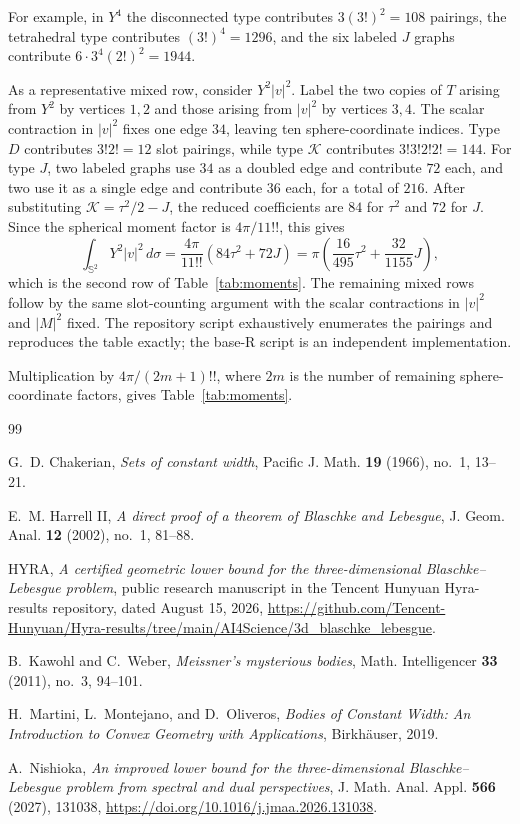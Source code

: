\documentclass[11pt,reqno]{amsart}
\theoremstyle{remark}
\newcommand{\Sph}{\mathbb S^2}
\newcommand{\dd}{\,d\sigma}
\newcommand{\abs}[1]{\left\lvert #1\right\rvert}
\begin{document}
For example, in $Y^4$ the disconnected type contributes
$3(3!)^2=108$ pairings, the tetrahedral type contributes $(3!)^4=1296$, and
the six labeled $J$ graphs contribute
$6\cdot 3^4(2!)^2=1944$.

As a representative mixed row, consider $Y^2\abs v^2$. Label the two copies of
$T$ arising from $Y^2$ by vertices $1,2$ and those arising from $\abs v^2$ by
vertices $3,4$. The scalar contraction in $\abs v^2$ fixes one edge $34$,
leaving ten sphere-coordinate indices. Type $D$ contributes $3!2!=12$ slot
pairings, while type $\mathcal K$ contributes $3!3!2!2!=144$. For type $J$,
two labeled graphs use $34$ as a doubled edge and contribute $72$ each, and
two use it as a single edge and contribute $36$ each, for a total of $216$.
After substituting $\mathcal K=\tau^2/2-J$, the reduced coefficients are
$84$ for $\tau^2$ and $72$ for $J$. Since the spherical moment factor is
$4\pi/11!!$, this gives
\[
 \int_{\Sph}Y^2\abs v^2\dd
 =\frac{4\pi}{11!!}(84\tau^2+72J)
 =\pi\left(\frac{16}{495}\tau^2+\frac{32}{1155}J\right),
\]
which is the second row of Table~\ref{tab:moments}. The remaining mixed rows
follow by the same slot-counting argument with the scalar contractions in
$\abs v^2$ and $\abs M^2$ fixed.
The repository script  exhaustively
enumerates the pairings and reproduces the table exactly; the base-R script
 is an independent implementation.

Multiplication by $4\pi/(2m+1)!!$, where $2m$ is the number of remaining
sphere-coordinate factors, gives Table~\ref{tab:moments}.

\begin{thebibliography}{99}

G.~D. Chakerian,
\emph{Sets of constant width},
Pacific J. Math. \textbf{19} (1966), no.~1, 13--21.

E.~M. Harrell II,
\emph{A direct proof of a theorem of Blaschke and Lebesgue},
J. Geom. Anal. \textbf{12} (2002), no.~1, 81--88.

HYRA,
\emph{A certified geometric lower bound for the three-dimensional
Blaschke--Lebesgue problem},
public research manuscript in the Tencent Hunyuan Hyra-results repository,
dated August 15, 2026,
\url{https://github.com/Tencent-Hunyuan/Hyra-results/tree/main/AI4Science/3d_blaschke_lebesgue}.

B.~Kawohl and C.~Weber,
\emph{Meissner's mysterious bodies},
Math. Intelligencer \textbf{33} (2011), no.~3, 94--101.

H.~Martini, L.~Montejano, and D.~Oliveros,
\emph{Bodies of Constant Width: An Introduction to Convex Geometry with
Applications},
Birkh\"auser, 2019.

A.~Nishioka,
\emph{An improved lower bound for the three-dimensional Blaschke--Lebesgue
problem from spectral and dual perspectives},
J. Math. Anal. Appl. \textbf{566} (2027), 131038,
\url{https://doi.org/10.1016/j.jmaa.2026.131038}.

\end{thebibliography}
\end{document}
